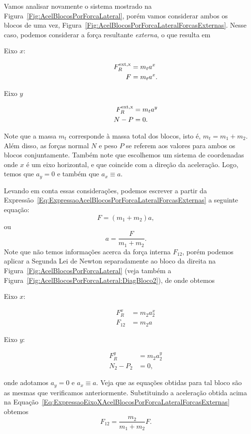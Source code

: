 Vamos analisar novamente o sistema mostrado na Figura~\ref{Fig:AcelBlocosPorForcaLateral}, porém vamos considerar ambos os blocos de uma vez, Figura~\ref{Fig:AcelBlocosPorForcaLateralForcasExternas}. Nesse caso, podemos considerar a força resultante \emph{externa}, o que resulta em
\begin{description}
    \item[Eixo $x$:] 
        \begin{align}
            F_{R}^{\rm{ext}, x} &= m_t a^x \\
            F &= m_t a^x. \label{Eq:ExpressaoAcelBlocosPorForcaLateralForcasExternas}
        \end{align}
    \item[Eixo $y$]
        \begin{align}
            F_{R}^{\rm{ext}, x} &= m_t a^y \\
            N - P &= 0.
        \end{align}
\end{description}
%
Note que a massa $m_t$ corresponde à massa total dos blocos, isto é, $m_t = m_1 + m_2$. Além disso, as forças normal $N$ e peso $P$ se referem aos valores para ambos os blocos conjuntamente. Também note que escolhemos um sistema de coordenadas onde $x$ é um eixo horizontal, e que coincide com a direção da aceleração. Logo, temos que $a_y = 0$ e também que $a_x \equiv a$.

Levando em conta essas considerações, podemos escrever a partir da Expressão~\eqref{Eq:ExpressaoAcelBlocosPorForcaLateralForcasExternas} a seguinte equação:
\begin{equation}
    F = (m_1 + m_2) a,
\end{equation}
%
ou
\begin{equation}
    a = \frac{F}{m_1 + m_2}.
\end{equation}
%
Note que não temos informações acerca da força interna $F_{12}$, porém podemos aplicar a Segunda Lei de Newton separadamente ao bloco da direita na Figura~\ref{Fig:AcelBlocosPorForcaLateral} (veja também a Figura~\ref{Fig:AcelBlocosPorForcaLateral:DiagBloco2}),
de onde obtemos
\begin{description}
    \item[Eixo $x$:] 
        \begin{align}
            F_R^x &= m_2 a_2^x \\
            F_{12} &= m_2 a \label{Eq:ExpressaoEixoXAcelBlocosPorForcaLateralForcasExternas}
        \end{align}
    \item[Eixo $y$:]
        \begin{align}
            F_R^y &= m_2 a_2^y \\
            N_2 - P_2 &= 0,
        \end{align}
\end{description}
%
onde adotamos $a_y = 0$ e $a_x \equiv a$. Veja que as equações obtidas para tal bloco são as mesmas que verificamos anteriormente. Substituindo a aceleração obtida acima na Equação~\eqref{Eq:ExpressaoEixoXAcelBlocosPorForcaLateralForcasExternas} obtemos
\begin{equation}
    F_{12} = \frac{m_2}{m_1 + m_2} F.
\end{equation}

